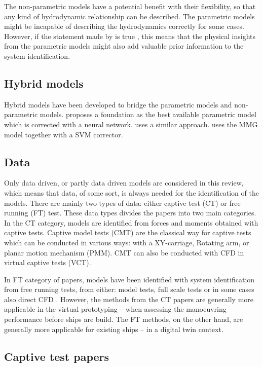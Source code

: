 The non-parametric models have a potential benefit with their flexibility, so that any kind of hydrodynamic relationship can be described. The parametric models might be incapable of describing the hydrodynamics correctly for some cases. However, if the statement made by \cite{revestidoherreroTwostepIdentificationNonlinear2012} is true , this means that the physical insights from the parametric models might also add valuable prior information to the system identification.
\subsection{Hybrid models}
Hybrid models have been developed to bridge the parametric models and non-parametric models. \cite{wangIncorporatingApproximateDynamics2021} proposes a foundation as the best available parametric model which is corrected with a neural network. \cite{nielsenMachineLearningEnhancement2022} uses a similar approach. \cite{dongMathdataIntegratedPrediction2023a} uses the MMG model together with a SVM corrector.
\subsection{Data}
Only data driven, or partly data driven models are considered in this review, which means that data, of some sort, is always needed for the identification of the models. There are mainly two types of data: either captive test (CT) or free running (FT) test. These data types divides the papers into two main categories. In the CT category, models are identified from forces and moments obtained with captive tests. Captive model tests (CMT) are the classical way for captive tests which can be conducted in various ways: with a XY-carriage, Rotating arm, or planar motion mechanism (PMM). CMT can also be conducted with CFD in virtual captive tests (VCT). 

In FT category of papers, models have been identified with system identification from free running tests, from either: model tests, full scale tests or in some cases also direct CFD \cite{arakiEstimatingManeuveringCoefficients2012}.  However, the methods from the CT papers are generally more applicable in the virtual prototyping – when assessing the manoeuvring performance before ships are build. The FT methods, on the other hand, are generally more applicable for existing ships – in a digital twin context.   
\subsection{Captive test papers}

